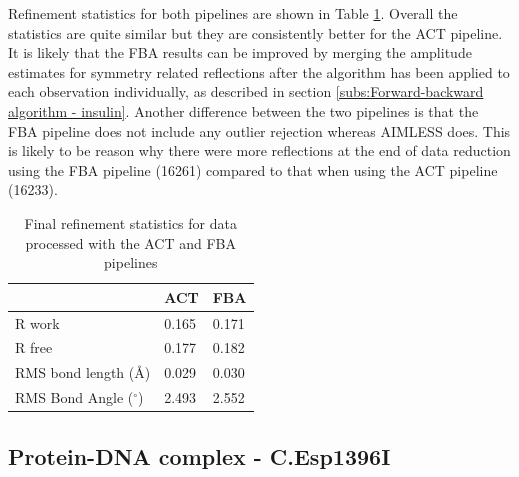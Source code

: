Refinement statistics for both pipelines are shown in Table \ref{tab:Refinement statistics - insulin}.
Overall the statistics are quite similar but they are consistently better for the ACT pipeline.
It is likely that the FBA results can be improved by merging the amplitude estimates for symmetry related reflections after the algorithm has been applied to each observation individually, as described in section \ref{subs:Forward-backward algorithm - insulin}.
Another difference between the two pipelines is that the FBA pipeline does not include any outlier rejection whereas AIMLESS does.
This is likely to be reason why there were more reflections at the end of data reduction using the FBA pipeline (16261) compared to that when using the ACT pipeline (16233).

\begin{table}[ht!]
	\caption[Final refinement statistics for data processed with the ACT and FBA pipelines.]{Final refinement statistics for data processed with the ACT and FBA pipelines}
	\centering
	\begin{tabular}{p{4cm} | p{2.5cm} | p{2.5cm}}
		   & ACT & FBA  \\
		\hline
		R work                      & 0.165   & 0.171 \\
		R free                      & 0.177   & 0.182 \\
		RMS bond length (\AA)       & 0.029   & 0.030 \\
        RMS Bond Angle ($^{\circ}$) & 2.493   & 2.552 \\
		\hline
	\end{tabular}
	\label{tab:Refinement statistics - insulin}
\end{table}

\subsection{Protein-DNA complex - C.Esp1396I}
\label{sub:Protein-DNA complex - C.Esp1396I}


